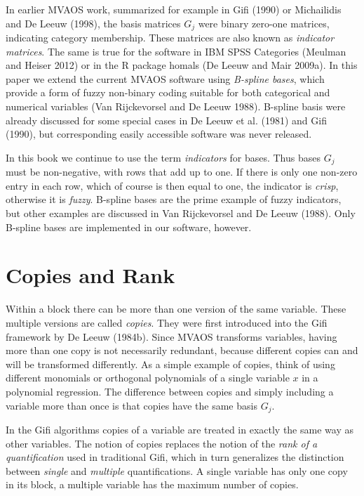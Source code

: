 \documentclass[
  12pt,
  letterpaper,
  DIV=11,
  numbers=noendperiod]{scrreprt}
\begin{document}
In earlier MVAOS work, summarized for example in Gifi (1990) or
Michailidis and De Leeuw (1998), the basis matrices \(G_j\) were binary
zero-one matrices, indicating category membership. These matrices are
also known as \emph{indicator matrices}. The same is true for the
software in IBM SPSS Categories (Meulman and Heiser 2012) or in the R
package homals (De Leeuw and Mair 2009a). In this paper we extend the
current MVAOS software using \emph{B-spline bases}, which provide a form
of fuzzy non-binary coding suitable for both categorical and numerical
variables (Van Rijckevorsel and De Leeuw 1988). B-spline basis were
already discussed for some special cases in De Leeuw et al. (1981) and
Gifi (1990), but corresponding easily accessible software was never
released.

In this book we continue to use the term \emph{indicators} for bases.
Thus bases \(G_j\) must be non-negative, with rows that add up to one.
If there is only one non-zero entry in each row, which of course is then
equal to one, the indicator is \emph{crisp}, otherwise it is
\emph{fuzzy}. B-spline bases are the prime example of fuzzy indicators,
but other examples are discussed in Van Rijckevorsel and De Leeuw
(1988). Only B-spline bases are implemented in our software, however.

\section{Copies and Rank}\label{copies-and-rank}

Within a block there can be more than one version of the same variable.
These multiple versions are called \emph{copies}. They were first
introduced into the Gifi framework by De Leeuw (1984b). Since MVAOS
transforms variables, having more than one copy is not necessarily
redundant, because different copies can and will be transformed
differently. As a simple example of copies, think of using different
monomials or orthogonal polynomials of a single variable \(x\) in a
polynomial regression. The difference between copies and simply
including a variable more than once is that copies have the same basis
\(G_j\).

In the Gifi algorithms copies of a variable are treated in exactly the
same way as other variables. The notion of copies replaces the notion of
the \emph{rank of a quantification} used in traditional Gifi, which in
turn generalizes the distinction between \emph{single} and
\emph{multiple} quantifications. A single variable has only one copy in
its block, a multiple variable has the maximum number of copies.
\end{document}

